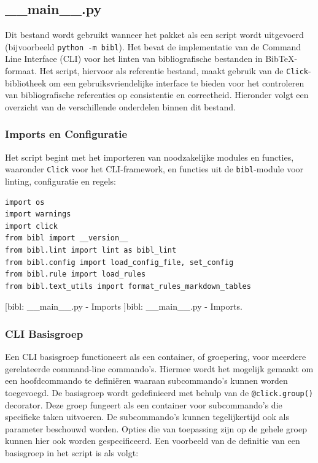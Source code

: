 \subsection{\_\_main\_\_.py}
Dit bestand wordt gebruikt wanneer het pakket als een script wordt uitgevoerd (bijvoorbeeld \texttt{python -m bibl}). Het bevat de implementatie van de Command Line Interface (CLI) voor het linten van bibliografische bestanden in BibTeX-formaat. Het script, hiervoor als referentie bestand, maakt gebruik van de \texttt{Click}-bibliotheek om een gebruiksvriendelijke interface te bieden voor het controleren van bibliografische referenties op consistentie en correctheid. Hieronder volgt een overzicht van de verschillende onderdelen binnen dit bestand.

\subsubsection{Imports en Configuratie}

Het script begint met het importeren van noodzakelijke modules en functies, waaronder \texttt{Click} voor het CLI-framework, en functies uit de \texttt{bibl}-module voor linting, configuratie en regels:

\begin{verbatim}
import os
import warnings
import click
from bibl import __version__
from bibl.lint import lint as bibl_lint
from bibl.config import load_config_file, set_config
from bibl.rule import load_rules
from bibl.text_utils import format_rules_markdown_tables
\end{verbatim}
[bibl: \_\_main\_\_.py - Imports ]{bibl: \_\_main\_\_.py - Imports. \label{lst:bibl_main_imports}}

\subsubsection{CLI Basisgroep}

Een CLI basisgroep functioneert als een container, of groepering, voor meerdere gerelateerde command-line commando's. Hiermee wordt het mogelijk gemaakt om een hoofdcommando te definiëren waaraan subcommando's kunnen worden toegevoegd.
De basisgroep wordt gedefinieerd met behulp van de \texttt{@click.group()} decorator. Deze groep fungeert als een container voor subcommando's die specifieke taken uitvoeren. De subcommando's kunnen tegelijkertijd ook als parameter beschouwd worden. Opties die van toepassing zijn op de gehele groep kunnen hier ook worden gespecificeerd. Een voorbeeld van de definitie van een basisgroep in het script is als volgt:

